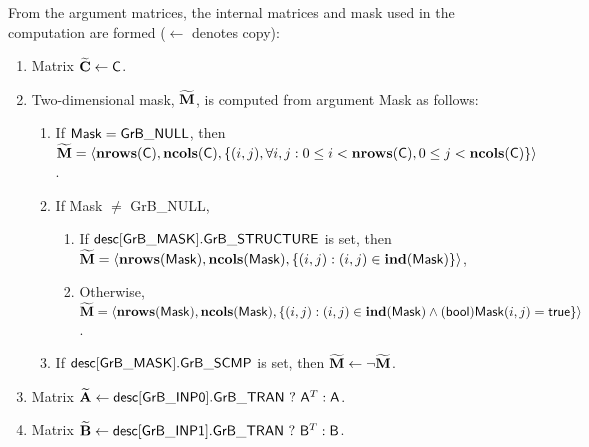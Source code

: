 From the argument matrices, the internal matrices and mask used in 
the computation are formed ($\leftarrow$ denotes copy):
\begin{enumerate}
	\item Matrix ${\bf \widetilde{C}} \leftarrow {\sf C}$.

	\item Two-dimensional mask, ${\bf \widetilde{M}}$, is computed from
    argument {\sf Mask} as follows:
	\begin{enumerate}
		\item If ${\sf Mask} = {\sf GrB\_NULL}$, then ${\bf \widetilde{M}} = 
        \langle \bold{nrows}({\sf C}), \bold{ncols}({\sf C}), \{(i,j), 
        \forall i,j : 0 \leq i <  \bold{nrows}({\sf C}), 0 \leq j < 
        \bold{ncols}({\sf C}) \} \rangle$.

		\item If {\sf Mask} $\ne$ {\sf GrB\_NULL}, 
        \begin{enumerate}
            \item If ${\sf desc[GrB\_MASK].GrB\_STRUCTURE}$ is set, then 
            ${\bf \widetilde{M}} = \langle \bold{nrows}({\sf Mask}), 
            \bold{ncols}({\sf Mask}), \{(i,j) : (i,j) \in \bold{ind}({\sf Mask}) \} \rangle$,
            \item Otherwise, ${\bf \widetilde{M}} = \langle \bold{nrows}({\sf Mask}), 
            \bold{ncols}({\sf Mask}), \\ \{(i,j) : (i,j) \in \bold{ind}({\sf Mask}) \wedge 
            ({\sf bool}){\sf Mask}(i,j) = {\sf true}\} \rangle$.
        \end{enumerate}

		\item	If ${\sf desc[GrB\_MASK].GrB\_SCMP}$ is set, then 
        ${\bf \widetilde{M}} \leftarrow \neg {\bf \widetilde{M}}$.
	\end{enumerate}

	\item Matrix ${\bf \widetilde{A}} \leftarrow
    {\sf desc[GrB\_INP0].GrB\_TRAN} \ ? \ {\sf A}^T : {\sf A}$.

	\item Matrix ${\bf \widetilde{B}} \leftarrow
    {\sf desc[GrB\_INP1].GrB\_TRAN} \ ? \ {\sf B}^T : {\sf B}$.
\end{enumerate}

